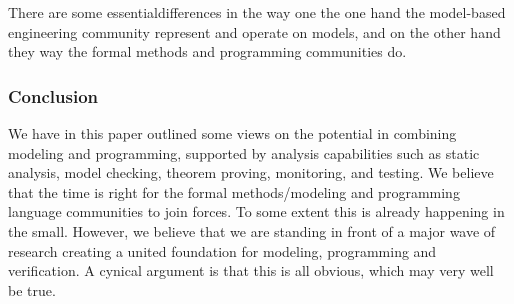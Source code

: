 There are some essentialdifferences in the way one the one hand the model-based engineering community represent and operate on models, and on the other hand they way the formal methods and programming communities do.



\subsubsection{Conclusion}

We have in this paper outlined some views on the potential in 
combining modeling and programming, supported by analysis 
capabilities such as static analysis, model checking, theorem 
proving, monitoring, and testing. We believe that the time is right 
for the formal methods/modeling and programming language 
communities to join forces. To some extent this is already 
happening in the small. However, we believe that we are standing in 
front of a major wave of research creating a united foundation for 
modeling, programming and verification. A cynical argument is that 
this is all obvious, which may very well be true. 